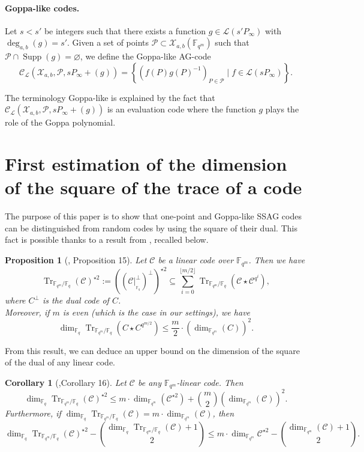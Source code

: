 \documentclass[a4paper]{article}
\newtheorem{proposition}[thm]{Proposition}
\newtheorem{coro}[thm]{Corollary}
\theoremstyle{definition}
\theoremstyle{remark}
\newcommand{\calP}{\mathcal{P}}
\newcommand{\calL}{\mathcal{L}}
\newcommand{\calC}{\mathcal{C}}
\newcommand{\calX}{\mathcal{X}}
\newcommand{\fqm}{\mathbb{F}_{q^m}}
\newcommand{\fq}{\mathbb{F}_{q}}
\newcommand{\F}{\mathbb{F}}
\newcommand{\Tr}[1]{\operatorname{Tr}_{\mathbb{F}_{q^m}/\fq}\left(#1\right)}
\newcommand{\set}[1]{\left\{#1\right\}}
\newcommand{\Supp}{\operatorname{Supp}}
\newcommand{\degab}[1]{\deg_{a,b}\left(#1\right)}
\begin{document}
\paragraph{Goppa-like codes.} Let $s<s'$ be integers such that there exists a function $g \in \calL(s'P_\infty)$ with $\degab{g}=s'$. Given a set of points  $\calP \subset \calX_{a,b}(\F_{q^m})$ such that $\calP \cap \Supp(g) = \varnothing$, we define the Goppa-like AG-code 
\[\calC_{\calL}(\calX_{a,b},\calP,sP_\infty+(g))=\set{\left(f(P)g(P)^{-1}\right)_{P \in \calP} \mid f \in \calL(sP_\infty)}.\]

\noindent The terminology Goppa-like is explained by the fact that $\calC_{\calL}(\calX_{a,b},\calP,sP_\infty+(g))$ is an evaluation code where the function $g$ plays the role of the Goppa polynomial.


\section{First estimation of the dimension of the square of the trace of a code}

The purpose of this paper is to show that one-point and Goppa-like SSAG codes   can be distinguished from random codes by using the square of their dual. This fact is possible thanks to a result from \cite{MT21}, recalled below.

\begin{proposition}[\cite{MT21}, Proposition 15] \label{prop:Tr_BoundSchurSquare}
Let $\calC$ be a linear code over $\fqm$. Then we have 
\begin{equation} \label{eq:key_equation} \Tr{\calC}^{\star2} := ((\calC|^{\perp}_{_{{\mathbb{F}_q}}})^{\perp})^{\star2} \subseteq \sum\limits_{i=0}^{\lfloor{m/2} \rfloor} \Tr{\calC\star \calC^{q^i}},
\end{equation}
where $C^{\perp}$ is the dual code of $C$. \\
Moreover, if $m$ is even (which is the case in our settings), we have 
\[\dim_{\mathbb{F}_q}\Tr{ C \star C^{q^{m/2}}} \leq \frac{m}{2}\cdot \left(\dim_{\fqm}(C)\right)^2.\]
\end{proposition}

From this result, we can deduce an upper bound on the dimension of the square of the dual of any linear code.

\begin{coro} [\cite{MT21},Corollary 16]\label{coro:first_bound_square_of_trace}
Let $\calC$ be any $\fqm$-linear code. Then 
\begin{equation} \label{eq:mumford_bound}
    \dim_{\fq}\Tr{\calC}^{\star2} \leq m \cdot \dim_{\fqm}(\calC^{\star 2}) + \binom{m}{2} (\dim_{\fqm}(\calC))^2.
\end{equation}
Furthermore, if $\dim_{\fq} \Tr{\calC} = m \cdot \dim_{\fqm}(\calC)$, then 
\[\dim_{\fq} \Tr{\calC}^{\star2} - \binom{\dim_{\fq} \Tr{\calC}+1}{2} \leq m \cdot \dim_{\fqm} \calC^{\star 2} - \binom{\dim_{\fqm} (\calC)+1}{2}.\]
\end{coro}
\end{document}
